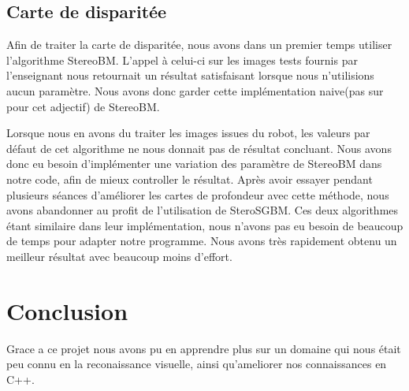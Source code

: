 \documentclass[a4paper]{article}
\begin{document}
\subsection{Carte de disparitée}

Afin de traiter la carte de disparitée, nous avons dans un premier temps utiliser l'algorithme StereoBM. L'appel à celui-ci sur les images tests fournis par l'enseignant nous retournait un résultat satisfaisant lorsque nous n'utilisions aucun paramètre. Nous avons donc garder cette implémentation naive(pas sur pour cet adjectif) de StereoBM.

Lorsque nous en avons du traiter les images issues du robot, les valeurs par défaut de cet algorithme ne nous donnait pas de résultat concluant. Nous avons donc eu besoin d'implémenter une variation des paramètre de StereoBM dans notre code, afin de mieux controller le résultat. Après avoir essayer pendant plusieurs séances d'améliorer les cartes de profondeur avec cette méthode, nous avons abandonner au profit de l'utilisation de SteroSGBM. Ces deux algorithmes étant similaire dans leur implémentation, nous n'avons pas eu besoin de beaucoup de temps pour adapter notre programme. Nous avons très rapidement obtenu un meilleur résultat avec beaucoup moins d'effort.



\section{Conclusion}

Grace a ce projet nous avons pu en apprendre plus sur un domaine qui nous était peu connu en la reconaissance visuelle, ainsi qu'ameliorer nos connaissances en C++.

\end{document}
